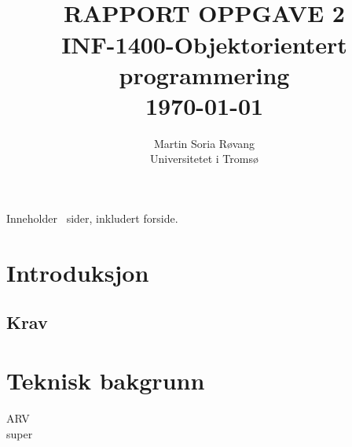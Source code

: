 




{\selectfont
\title{ \normalsize \textsc{}
		\\ [3.0cm] %
        \LARGE \textbf{\uppercase{Rapport Oppgave 2}
        \HRule{0.5pt} \\ [0.5cm]
        INF-1400-Objektorientert programmering
        \\
		\normalsize \today \vspace*{5\baselineskip}}
		}

        \date{}
\author{
		Martin Soria Røvang \\ 
        Universitetet i Tromsø \\}

\clearpage\maketitle
\vspace{0.2\textheight}
{\centering
Inneholder \pageref{LastPage} \, sider, inkludert forside.\par
}
\thispagestyle{empty}

\newpage
\tableofcontents


\newpage

\section{Introduksjon}

\subsection{Krav}


\section{Teknisk bakgrunn}
ARV \\
super

}
